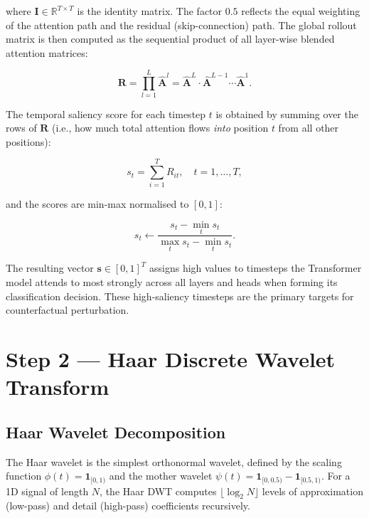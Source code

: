 where $\mathbf{I} \in \mathbb{R}^{T \times T}$ is the identity matrix. The factor $0.5$ reflects the equal weighting of the attention path and the residual (skip-connection) path. The global rollout matrix is then computed as the sequential product of all layer-wise blended attention matrices:

\begin{equation}
    \mathbf{R} = \prod_{l=1}^{L} \hat{\mathbf{A}}^l = \hat{\mathbf{A}}^L \cdot \hat{\mathbf{A}}^{L-1} \cdots \hat{\mathbf{A}}^1.
\end{equation}

The temporal saliency score for each timestep $t$ is obtained by summing over the rows of $\mathbf{R}$ (i.e., how much total attention flows \emph{into} position $t$ from all other positions):

\begin{equation}
    s_t = \sum_{i=1}^{T} R_{it}, \quad t = 1, \ldots, T,
\end{equation}

and the scores are min-max normalised to $[0, 1]$:

\begin{equation}
    s_t \leftarrow \frac{s_t - \min_t s_t}{\max_t s_t - \min_t s_t}.
\end{equation}

The resulting vector $\mathbf{s} \in [0,1]^T$ assigns high values to timesteps the Transformer model attends to most strongly across all layers and heads when forming its classification decision. These high-saliency timesteps are the primary targets for counterfactual perturbation.

\section{Step 2 — Haar Discrete Wavelet Transform}

\subsection{Haar Wavelet Decomposition}

The Haar wavelet is the simplest orthonormal wavelet, defined by the scaling function $\phi(t) = \mathbf{1}_{[0,1)}$ and the mother wavelet $\psi(t) = \mathbf{1}_{[0,0.5)} - \mathbf{1}_{[0.5,1)}$. For a 1D signal of length $N$, the Haar DWT computes $\lfloor \log_2 N \rfloor$ levels of approximation (low-pass) and detail (high-pass) coefficients recursively.

